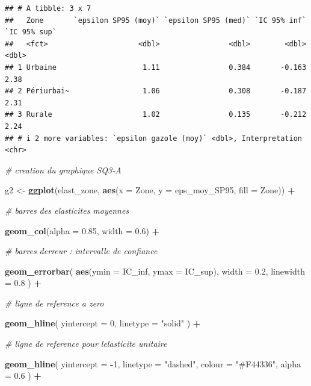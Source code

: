 \documentclass[
]{article}
\newenvironment{Shaded}{\begin{snugshade}}{\end{snugshade}}
\newcommand{\AttributeTok}[1]{\textcolor[rgb]{0.13,0.29,0.53}{#1}}
\newcommand{\CommentTok}[1]{\textcolor[rgb]{0.56,0.35,0.01}{\textit{#1}}}
\newcommand{\DecValTok}[1]{\textcolor[rgb]{0.00,0.00,0.81}{#1}}
\newcommand{\FloatTok}[1]{\textcolor[rgb]{0.00,0.00,0.81}{#1}}
\newcommand{\FunctionTok}[1]{\textcolor[rgb]{0.13,0.29,0.53}{\textbf{#1}}}
\newcommand{\NormalTok}[1]{#1}
\newcommand{\OtherTok}[1]{\textcolor[rgb]{0.56,0.35,0.01}{#1}}
\newcommand{\SpecialCharTok}[1]{\textcolor[rgb]{0.81,0.36,0.00}{\textbf{#1}}}
\newcommand{\StringTok}[1]{\textcolor[rgb]{0.31,0.60,0.02}{#1}}
\begin{document}
\begin{verbatim}
## # A tibble: 3 x 7
##   Zone       `epsilon SP95 (moy)` `epsilon SP95 (med)` `IC 95% inf` `IC 95% sup`
##   <fct>                     <dbl>                <dbl>        <dbl>        <dbl>
## 1 Urbaine                    1.11                0.384       -0.163         2.38
## 2 Périurbai~                 1.06                0.308       -0.187         2.31
## 3 Rurale                     1.02                0.135       -0.212         2.24
## # i 2 more variables: `epsilon gazole (moy)` <dbl>, Interpretation <chr>
\end{verbatim}

\begin{Shaded}
\begin{Highlighting}[]
\CommentTok{\# creation du graphique SQ3{-}A}

\NormalTok{g2 }\OtherTok{\textless{}{-}} \FunctionTok{ggplot}\NormalTok{(elast\_zone, }\FunctionTok{aes}\NormalTok{(}\AttributeTok{x =}\NormalTok{ Zone, }\AttributeTok{y =}\NormalTok{ eps\_moy\_SP95, }\AttributeTok{fill =}\NormalTok{ Zone)) }\SpecialCharTok{+}

  \CommentTok{\# barres des elasticites moyennes}

  \FunctionTok{geom\_col}\NormalTok{(}\AttributeTok{alpha =} \FloatTok{0.85}\NormalTok{, }\AttributeTok{width =} \FloatTok{0.6}\NormalTok{) }\SpecialCharTok{+}

  \CommentTok{\# barres d\textquotesingle{}erreur : intervalle de confiance}

  \FunctionTok{geom\_errorbar}\NormalTok{(}
    \FunctionTok{aes}\NormalTok{(}\AttributeTok{ymin =}\NormalTok{ IC\_inf, }\AttributeTok{ymax =}\NormalTok{ IC\_sup),}
    \AttributeTok{width =} \FloatTok{0.2}\NormalTok{,}
    \AttributeTok{linewidth =} \FloatTok{0.8}
\NormalTok{  ) }\SpecialCharTok{+}

  \CommentTok{\# ligne de reference a zero}

  \FunctionTok{geom\_hline}\NormalTok{(}
    \AttributeTok{yintercept =} \DecValTok{0}\NormalTok{,}
    \AttributeTok{linetype =} \StringTok{"solid"}
\NormalTok{  ) }\SpecialCharTok{+}

  \CommentTok{\# ligne de reference pour l\textquotesingle{}elasticite unitaire}

  \FunctionTok{geom\_hline}\NormalTok{(}
    \AttributeTok{yintercept =} \SpecialCharTok{{-}}\DecValTok{1}\NormalTok{,}
    \AttributeTok{linetype =} \StringTok{"dashed"}\NormalTok{,}
    \AttributeTok{colour =} \StringTok{"\#F44336"}\NormalTok{,}
    \AttributeTok{alpha =} \FloatTok{0.6}
\NormalTok{  ) }\SpecialCharTok{+}


\end{Highlighting}
\end{Shaded}
\end{document}
